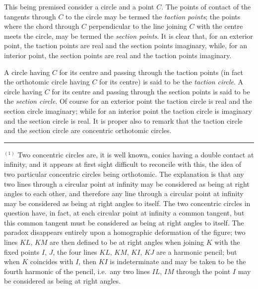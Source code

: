 \documentclass[11pt,a4paper]{book}
\begin{document}
This being premised consider a circle and a point $C$. The points of contact of the tangents through $C$ to the circle may be termed the \textit{taction points}; the points where the chord through $C$ perpendicular to the line joining $C$ with the centre meets the circle, may be termed the \textit{section points}. It is clear that, for an exterior point, the taction points are real and the section points imaginary, while, for an interior point, the section points are real and the taction points imaginary.

A circle having $C$ for its centre and passing through the taction points (in fact the orthotomic circle having $C$ for its centre) is said to be the \textit{taction circle}. A circle having $C$ for its centre and passing through the section points is said to be the \textit{section circle}. Of course for an exterior point the taction circle is real and the section circle imaginary; while for an interior point the taction circle is imaginary and the section circle is real. It is proper also to remark that the taction circle and the section circle are concentric orthotomic circles.

\rule{0.5\textwidth}{0.4pt}

$^{(1)}$ Two concentric circles are, it is well known, conics having a double contact at infinity, and it appears at first sight difficult to reconcile with this, the idea of two particular concentric circles being orthotomic. The explanation is that any two lines through a circular point at infinity may be considered as being at right angles to each other, and therefore any line through a circular point at infinity may be considered as being at right angles to itself. The two concentric circles in question have, in fact, at each circular point at infinity a common tangent, but this common tangent must be considered as being at right angles to itself. The paradox disappears entirely upon a homographic deformation of the figure; two lines $KL$, $KM$ are then defined to be at right angles when joining $K$ with the fixed points $I$, $J$, the four lines $KL$, $KM$, $KI$, $KJ$ are a harmonic pencil; but when $K$ coincides with $I$, then $KI$ is indeterminate and may be taken to be the fourth harmonic of the pencil, i.e.\ any two lines $IL$, $IM$ through the point $I$ may be considered as being at right angles.

\newpage
[183]
\end{document}
